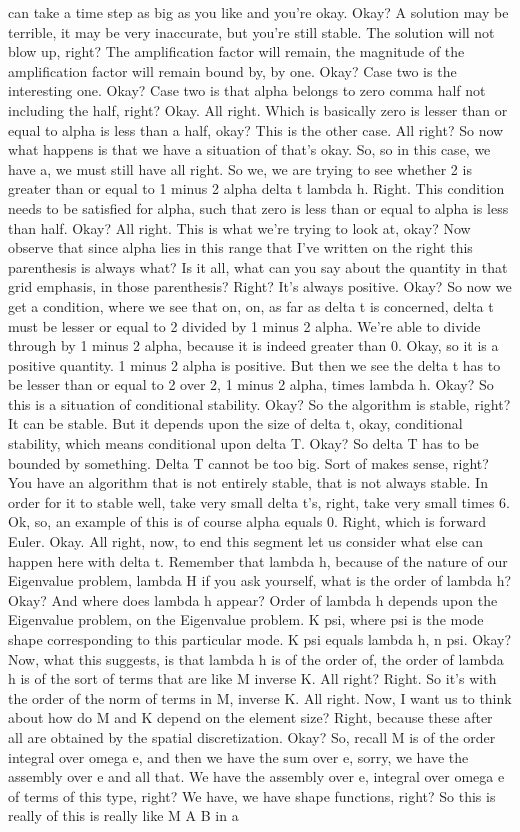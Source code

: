\documentclass[10pt]{article}
\begin{document}
can take a time step as big as you like and you're okay. Okay? A solution may be terrible, it may be very inaccurate, but you're still stable. The solution will not blow up, right? The amplification factor will remain, the magnitude of the amplification factor will remain bound by, by one. Okay? Case two is the interesting one. Okay? Case two is that alpha belongs to zero comma half not including the half, right? Okay. All right. Which is basically zero is lesser than or equal to alpha is less than a half, okay? This is the other case. All right? So now what happens is that we have a situation of that's okay. So, so in this case, we have a, we must still have all right. So we, we are trying to see whether 2 is greater than or equal to 1 minus 2 alpha delta t lambda h. Right. This condition needs to be satisfied for alpha, such that zero is less than or equal to alpha is less than half. Okay? All right. This is what we're trying to look at, okay? Now observe that since alpha lies in this range that I've written on the right this parenthesis is always what? Is it all, what can you say about the quantity in that grid emphasis, in those parenthesis? Right? It's always positive. Okay? So now we get a condition, where we see that on, on, as far as delta t is concerned, delta t must be lesser or equal to 2 divided by 1 minus 2 alpha. We're able to divide through by 1 minus 2 alpha, because it is indeed greater than 0. Okay, so it is a positive quantity. 1 minus 2 alpha is positive. But then we see the delta t has to be lesser than or equal to 2 over 2, 1 minus 2 alpha, times lambda h. Okay? So this is a situation of conditional stability. Okay? So the algorithm is stable, right? It can be stable. But it depends upon the size of delta t, okay, conditional stability, which means conditional upon delta T. Okay? So delta T has to be bounded by something. Delta T cannot be too big. Sort of makes sense, right? You have an algorithm that is not entirely stable, that is not always stable. In order for it to stable well, take very small delta t's, right, take very small times 6. Ok, so, an example of this is of course alpha equals 0. Right, which is forward Euler. Okay. All right, now, to end this segment let us consider what else can happen here with delta t. Remember that lambda h, because of the nature of our Eigenvalue problem, lambda H if you ask yourself, what is the order of lambda h? Okay? And where does lambda h appear? Order of lambda h depends upon the Eigenvalue problem, on the Eigenvalue problem. K psi, where psi is the mode shape corresponding to this particular mode. K psi equals lambda h, n psi. Okay? Now, what this suggests, is that lambda h is of the order of, the order of lambda h is of the sort of terms that are like M inverse K. All right? Right. So it's with the order of the norm of terms in M, inverse K. All right. Now, I want us to think about how do M and K depend on the element size? Right, because these after all are obtained by the spatial discretization. Okay? So, recall M is of the order integral over omega e, and then we have the sum over e, sorry, we have the assembly over e and all that. We have the assembly over e, integral over omega e of terms of this type, right? We have, we have shape functions, right? So this is really of this is really like M A B in a 
\end{document}
